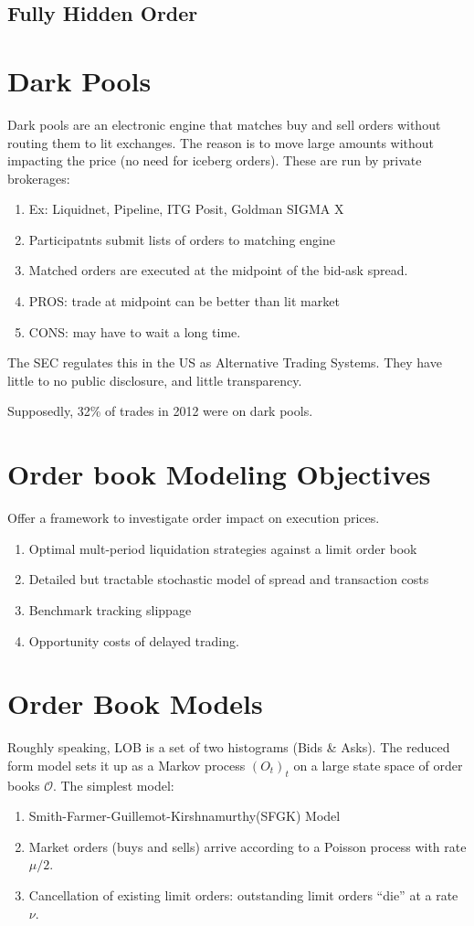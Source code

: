 \subsection{Fully Hidden Order}

\section{Dark Pools}
Dark pools are an electronic engine that matches buy and sell orders without routing them to lit exchanges.
The reason is to move large amounts without impacting the price (no need for iceberg orders).
These are run by private brokerages:
\begin{enumerate}
	\item Ex: Liquidnet, Pipeline, ITG Posit, Goldman SIGMA X
	\item Participatnts submit lists of orders to matching engine
	\item Matched orders are executed at the midpoint of the bid-ask spread.
	\item PROS: trade at midpoint can be better than lit market
	\item CONS: may have to wait a long time.
\end{enumerate}
The SEC regulates this in the US as Alternative Trading Systems.
They have little to no public disclosure, and little transparency.

Supposedly, 32\% of trades in 2012 were on dark pools.


\section{Order book Modeling Objectives}
Offer a framework to investigate order impact on execution prices.
\begin{enumerate}
	\item Optimal mult-period liquidation strategies against a limit order book
	\item Detailed but tractable stochastic model of spread and transaction costs
	\item Benchmark tracking slippage
	\item Opportunity costs of delayed trading.
\end{enumerate}

\section{Order Book Models}
Roughly speaking, LOB is a set of two histograms (Bids \& Asks). The reduced form model sets it up as a Markov process $(O_t)_t$ on a large state space of order books $\mathcal{O}$. The simplest model:
\begin{enumerate}
	\item Smith-Farmer-Guillemot-Kirshnamurthy(SFGK) Model
	\item Market orders (buys and sells) arrive according to a Poisson process with rate $\mu/2$.
	\item Cancellation of existing limit orders: outstanding limit orders ``die'' at a rate $\nu$.
\end{enumerate}

